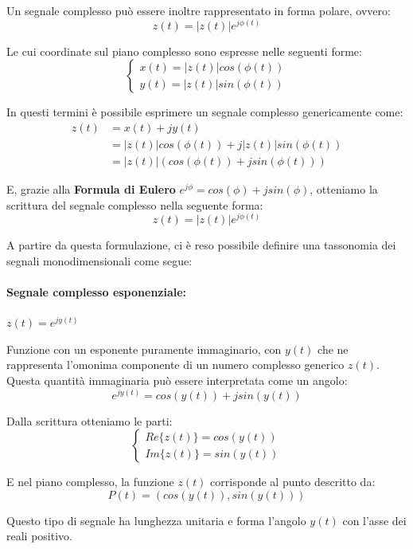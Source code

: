 \noindent Un segnale complesso può essere inoltre rappresentato in forma polare, ovvero: \[
    z(t) = |z(t)|e^{j\phi(t)}
\]

\noindent Le cui coordinate sul piano complesso sono espresse nelle seguenti forme: \[ \begin{cases}
    x(t) = |z(t)|cos(\phi(t))\\
    y(t) = |z(t)|sin(\phi(t))
\end{cases} \]

\noindent In questi termini è possibile esprimere un segnale complesso genericamente come: \begin{equation}
    \begin{split}
        z(t) &= x(t) + jy(t)\\
            &= |z(t)|cos(\phi(t)) + j|z(t)|sin(\phi(t))\\
            &= |z(t)|(cos(\phi(t)) + jsin(\phi(t)))
    \end{split}
\end{equation}

\noindent E, grazie alla \textbf{Formula di Eulero} $e^{j\phi} = cos(\phi) + jsin(\phi)$, otteniamo la scrittura del segnale complesso nella seguente
forma: \[
    z(t) = |z(t)|e^{j\phi(t)}
\]

\noindent A partire da questa formulazione, ci è reso possibile definire una tassonomia dei segnali monodimensionali come segue:

\paragraph{Segnale complesso esponenziale:} $z(t) = e^{jy(t)}$\par
Funzione con un esponente puramente immaginario, con $y(t)$ che ne rappresenta l'omonima componente di un numero complesso generico $z(t)$. Questa
quantità immaginaria può essere interpretata come un angolo: \[
    e^{jy(t)} = cos(y(t)) + jsin(y(t))
\]

\noindent Dalla scrittura otteniamo le parti: \[ \begin{cases}
    Re\{z(t)\} = cos(y(t))\\
    Im\{z(t)\} = sin(y(t))
\end{cases} \]

\noindent E nel piano complesso, la funzione $z(t)$ corrisponde al punto descritto da: \[
    P(t) = (cos(y(t)), sin(y(t)))
\]

\noindent Questo tipo di segnale ha lunghezza unitaria e forma l'angolo $y(t)$ con l'asse dei reali positivo.

